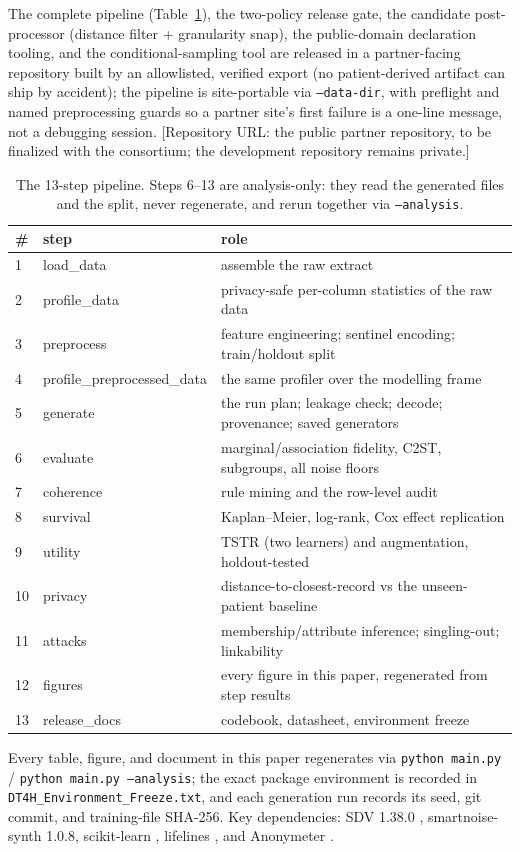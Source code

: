 \documentclass[11pt,a4paper]{article}
\begin{document}
The complete pipeline (Table~\ref{tab:pipeline}), the two-policy release gate,
the candidate post-processor (distance filter + granularity snap), the
public-domain declaration tooling, and the conditional-sampling tool are released
in a partner-facing repository built by an allowlisted, verified export (no
patient-derived artifact can ship by accident); the pipeline is site-portable via
\texttt{--data-dir}, with preflight and named preprocessing guards so a partner
site's first failure is a one-line message, not a debugging session.
[Repository URL: the public partner repository, to be finalized with the
consortium; the development repository remains private.]

\begin{table}[htbp]
\centering
\small
\caption{The 13-step pipeline. Steps 6--13 are analysis-only: they read the
generated files and the split, never regenerate, and rerun together via
\texttt{--analysis}.}
\label{tab:pipeline}
\begin{tabular}{lll}
\toprule
\# & step & role \\
\midrule
1 & load\_data & assemble the raw extract \\
2 & profile\_data & privacy-safe per-column statistics of the raw data \\
3 & preprocess & feature engineering; sentinel encoding; train/holdout split \\
4 & profile\_preprocessed\_data & the same profiler over the modelling frame \\
5 & generate & the run plan; leakage check; decode; provenance; saved generators \\
6 & evaluate & marginal/association fidelity, C2ST, subgroups, all noise floors \\
7 & coherence & rule mining and the row-level audit \\
8 & survival & Kaplan--Meier, log-rank, Cox effect replication \\
9 & utility & TSTR (two learners) and augmentation, holdout-tested \\
10 & privacy & distance-to-closest-record vs the unseen-patient baseline \\
11 & attacks & membership/attribute inference; singling-out; linkability \\
12 & figures & every figure in this paper, regenerated from step results \\
13 & release\_docs & codebook, datasheet, environment freeze \\
\bottomrule
\end{tabular}
\end{table} Every table, figure,
and document in this paper regenerates via \texttt{python main.py} /
\texttt{python main.py --analysis}; the exact package environment is recorded in
\texttt{DT4H\_Environment\_Freeze.txt}, and each generation run records its seed, git
commit, and training-file SHA-256. Key dependencies: SDV 1.38.0
\citep{patki2016sdv}, smartnoise-synth 1.0.8, scikit-learn
\citep{pedregosa2011scikit}, lifelines \citep{davidsonpilon2019lifelines}, and
Anonymeter \citep{giomi2023unified}.
\end{document}
